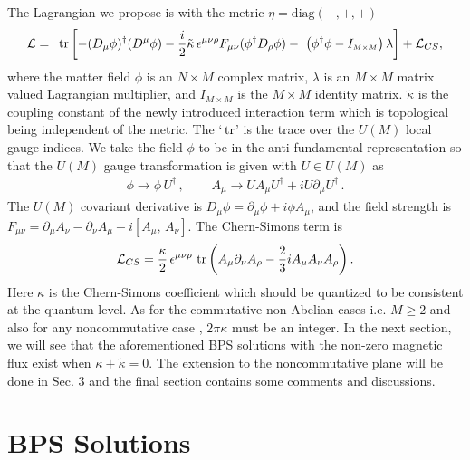 \documentclass[a4paper,12pt]{article}
\def\tr{{\mbox{\,tr}}}
\def\I_M{{I_{\scriptscriptstyle M\times M}}}
\def\const{{\tilde{\kappa}}}
\begin{document}
The Lagrangian we propose is  with the metric $\eta=\mbox{diag}(-,+,+)$
\begin{eqnarray}\label{lag}
{\cal L}=\,\,\tr\left[-(D_\mu \phi)^\dagger(D^\mu \phi)
-\frac{i}{2}\const \,\epsilon^{\mu\nu\rho}F_{\mu\nu}(\phi^\dagger
D_\rho \phi) -\,\,\left( \phi^\dagger
\phi-\I_M\right)\lambda\right]+{\cal L}_{CS},
\label{lag1}
\end{eqnarray}
where the matter field $\phi$ is an $N\times M$ complex matrix,
$\lambda$ is an $M\times
M$ matrix valued Lagrangian multiplier, and
$\I_M$ is the $M\times M$ identity matrix.
$\const$ is the coupling constant of the newly
introduced interaction term  which is topological being independent of the
metric. The `$\tr$' is the trace over the $U(M)$ local gauge indices.
We take the field $\phi$ to be in
the anti-fundamental representation so that the $U(M)$ gauge transformation is
given with $U\in U(M)$ as
\begin{equation}
\begin{array}{ll}
\phi\rightarrow\phi\,U^{\dagger}\,,~~~&~~~A_{\mu}\rightarrow
UA_{\mu}U^{\dagger}+iU\partial_{\mu}U^{\dagger}\,.
\end{array}
\label{gauge}
\end{equation}
The $U(M)$ covariant derivative is
 $D_\mu\phi=\partial_\mu\phi+i\phi A_\mu$,
and the  field strength is
$F_{\mu\nu}=\partial_{\mu}A_{\nu}-\partial_{\nu}A_{\mu}-i[A_\mu,\,A_\nu]$.
The Chern-Simons term  is
\begin{eqnarray}
{\cal L}_{CS}=\frac{\kappa}{2}\,\epsilon^{\mu\nu\rho}\,\tr\left(A_\mu
\partial_\nu
A_\rho-\frac{2}{3}i A_\mu A_\nu A_\rho \right).
\label{cs}
\end{eqnarray}
Here $\kappa$ is the Chern-Simons coefficient which should be quantized to be
consistent at the quantum level. As for the commutative non-Abelian cases i.e. $M\geq 2$ and also for  any
noncommutative case \cite{0102188},   $2\pi\kappa$ must be an integer. In the next section, we will see that the
aforementioned BPS solutions with the non-zero magnetic flux exist when
$\kappa+\tilde\kappa=0$. The extension to the noncommutative plane will be
done in Sec. 3 and the final section contains some comments and discussions.




\section{BPS Solutions}
\end{document}
